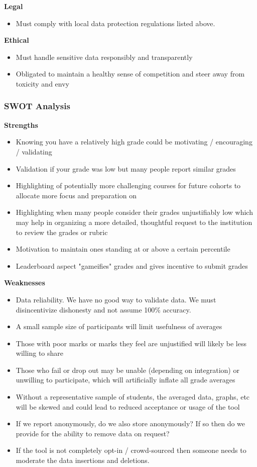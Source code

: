 \documentclass{article}
\begin{document}
\textbf{Legal}
\begin{itemize}
    \item Must comply with local data protection regulations listed above.
\end{itemize}
\textbf{Ethical}
\begin{itemize}
    \item Must handle sensitive data responsibly and transparently
    \item Obligated to maintain a healthy sense of competition and steer away from toxicity and envy
\end{itemize}
\bigskip

\noindent \subsubsection{SWOT Analysis}
\textbf{Strengths}
\begin{itemize}
    \item Knowing you have a relatively high grade could be motivating / encouraging / validating
    \item Validation if your grade was low but many people report similar grades
    \item Highlighting of potentially more challenging courses for future cohorts to allocate more focus and preparation on
    \item Highlighting when many people consider their grades unjustifiably low which may help in organizing a more detailed, thoughtful request to the institution to review the grades or rubric
    \item Motivation to maintain ones standing at or above a certain percentile
    \item Leaderboard aspect "gameifies" grades and gives incentive to submit grades
\end{itemize}
\textbf{Weaknesses}
\begin{itemize}
    \item Data reliability. We have no good way to validate data. We must disincentivize dishonesty and not assume 100\% accuracy.
    \item A small sample size of participants will limit usefulness of averages
    \item Those with poor marks or marks they feel are unjustified will likely be less willing to share
    \item Those who fail or drop out may be unable (depending on integration) or unwilling to participate, which will artificially inflate all grade averages
    \item Without a   representative sample of students, the averaged data, graphs, etc will be skewed and could lead to reduced acceptance or usage of the tool
    \item If we report anonymously, do we also store anonymously? If so then do we provide for the ability to remove data on request?
    \item If the tool is not completely opt-in / crowd-sourced then someone needs to moderate the data insertions and deletions.
\end{itemize}
\end{document}
